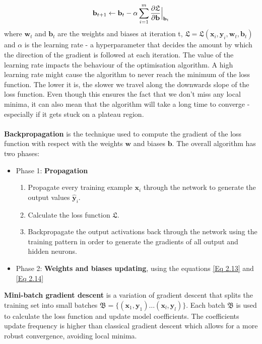  	\begin{equation}
	 	\centering
	 	\mathbf{b}_{t+1} \leftarrow \mathbf{b}_t - \alpha \sum_{i=1}^{m}\frac{\partial \mathfrak{L}}{\partial \mathbf{b}}\Bigr|_{\substack{\mathbf{b}_t}}
	 	\label{Eq 2.14}
 	\end{equation}
 	where $\mathbf{w}_t$ and $\mathbf{b}_t$ are the weights and biases at iteration t, $\mathfrak{L} = \mathfrak{L}(\mathbf{x}_i, \mathbf{y}_i, \mathbf{w}_t, \mathbf{b}_t)$ and $\alpha$ is the learning rate - a hyperparameter that decides the amount by which the direction of the gradient is followed at each iteration. The value of the learning rate impacts the behaviour of the optimisation algorithm. A high learning rate might cause the algorithm to never reach the minimum of the loss function. The lower it is, the slower we travel along the downwards slope of the loss function. Even though this ensures the fact that we don't miss any local minima, it can also mean that the algorithm will take a long time to converge - especially if it gets stuck on a plateau region. 
	\\ \\
	\textbf{Backpropagation} is the technique used to compute the gradient of the loss function with respect with the weights $\mathbf{w}$ and biases $\mathbf{b}$. The overall algorithm has two phases:
	\begin{itemize}
		\item Phase 1: \textbf{Propagation}
		\begin{enumerate}
			\item Propagate every training example $\mathbf{x}_i$ through the network to generate the output values $\mathbf{\hat{y}}_i$.
			\item Calculate the loss function $\mathfrak{L}$.
			\item Backpropagate the output activations back through the network using the training pattern in order to generate the gradients of all output and hidden neurons.
		\end{enumerate}
		\item Phase 2: \textbf{Weights and biases updating}, using the equations \ref{Eq 2.13} and \ref{Eq 2.14}
	\end{itemize}
	\textbf{Mini-batch gradient descent} is a variation of gradient descent that splits the training set into small batches $\mathfrak{B}=\{(\mathbf{x}_1, \mathbf{y}_1)\dots(\mathbf{x}_l, \mathbf{y}_l)\}$. Each batch $\mathfrak{B}$ is used to calculate the loss function and update model coefficients. The coefficients update frequency is higher than classical gradient descent which allows for a more robust convergence, avoiding local minima. 
	
